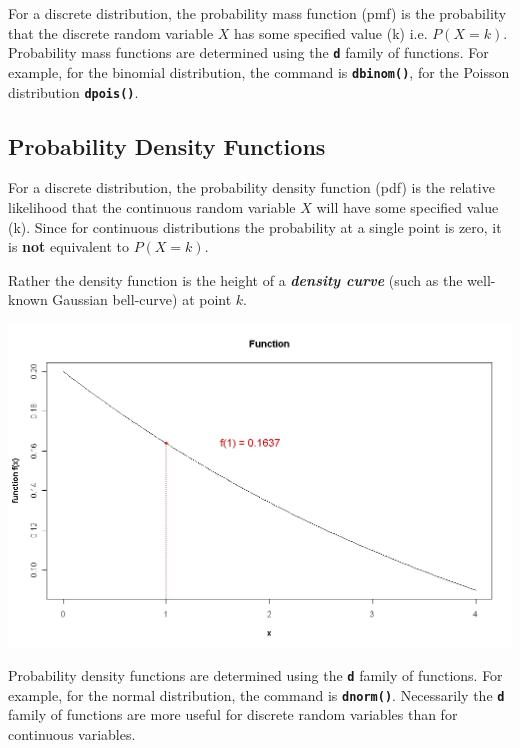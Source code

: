 \documentclass[a4paper,12pt]{article}
\begin{document}
For a discrete distribution, the probability mass function (pmf) is the probability that the discrete random variable $X$ has some specified value (k) i.e. $P(X = k)$. Probability mass functions are determined using the \texttt{\textbf{d}} family of functions. For example, for the binomial distribution, the command is \texttt{\textbf{dbinom()}}, for the Poisson distribution \texttt{\textbf{dpois()}}. 

\subsection{Probability Density Functions} 
For a discrete distribution, the probability density function (pdf) is the relative likelihood that the continuous random variable $X$ will have some specified value (k).
Since for continuous distributions the probability at a single point is zero, it is \textbf{not} equivalent to $P(X = k)$.

Rather the density function is the height of a \textbf{\textit{density curve}} (such as the well-known Gaussian bell-curve) at point $k$.

\begin{center}
\includegraphics[scale=0.40]{6AFunction}
\end{center}
 
 
Probability density functions are determined using the \texttt{\textbf{d}} family of functions. For example, for the normal distribution, the command is \texttt{\textbf{dnorm()}}. 
Necessarily the  \texttt{\textbf{d}} family of functions are more useful for discrete random variables than for continuous variables.
\end{document}
